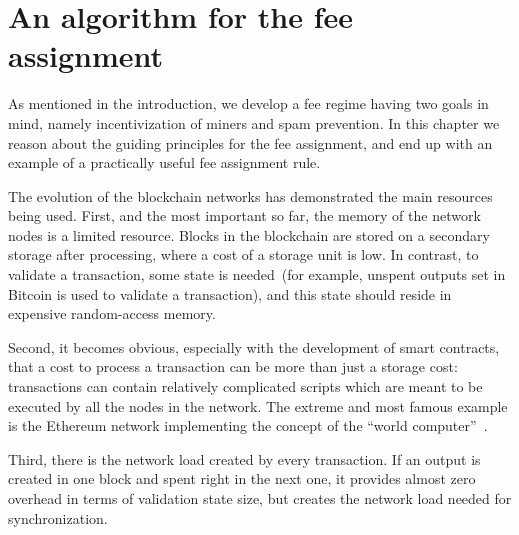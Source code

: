\documentclass[]{llncs}   %
\begin{document}
\section{An algorithm for the fee assignment}
\label{sec:algorithm}

As mentioned in the introduction, we develop a fee regime having two goals
in mind, namely incentivization of miners and spam prevention.  In this chapter
we reason about the guiding  principles for the fee assignment, and end up with
an example of a practically useful fee assignment rule.

The evolution of the blockchain networks has demonstrated the main resources
being used. First, and the most important so far, the memory of the network nodes 
is a limited resource. Blocks in the blockchain are stored on a 
secondary storage after processing, where a cost of a storage unit is low. In contrast, to validate a 
transaction, some state is needed~(for example, unspent outputs set in Bitcoin is used 
to validate a transaction), and this state should reside in expensive random-access memory.   

Second, it becomes obvious, especially with the development of smart contracts,
that a cost to process a transaction can be more than just a storage cost:
transactions can contain relatively complicated scripts which are meant to be
executed by all the nodes in the network. The extreme and most famous example is
the Ethereum network implementing the concept of the ``world computer''~\cite{ethyp}. 

Third, there is the network load created by every transaction. If an output is
created in one block and spent right in the next one, it provides almost zero
overhead in terms of validation state size, but creates the network load needed
for synchronization.
\end{document}
